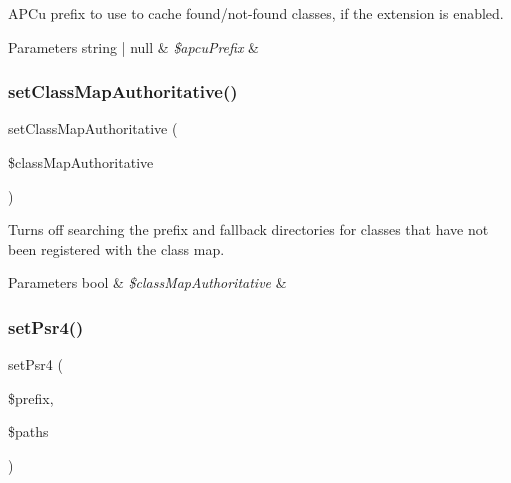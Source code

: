 A\+P\+Cu prefix to use to cache found/not-\/found classes, if the extension is enabled.


\begin{DoxyParams}[1]{Parameters}
string | null & {\em \$apcu\+Prefix} & \\
\hline
\end{DoxyParams}
\mbox{\label{class_composer_1_1_autoload_1_1_class_loader_aa3d6610396da6f5bef836d4fc5547816}} 
\subsubsection{\texorpdfstring{set\+Class\+Map\+Authoritative()}{setClassMapAuthoritative()}}
{\footnotesize\ttfamily set\+Class\+Map\+Authoritative (\begin{DoxyParamCaption}\item[{}]{\$class\+Map\+Authoritative }\end{DoxyParamCaption})}

Turns off searching the prefix and fallback directories for classes that have not been registered with the class map.


\begin{DoxyParams}[1]{Parameters}
bool & {\em \$class\+Map\+Authoritative} & \\
\hline
\end{DoxyParams}
\mbox{\label{class_composer_1_1_autoload_1_1_class_loader_a7f92172519c08357430e7da877a88995}} 
\subsubsection{\texorpdfstring{set\+Psr4()}{setPsr4()}}
{\footnotesize\ttfamily set\+Psr4 (\begin{DoxyParamCaption}\item[{}]{\$prefix,  }\item[{}]{\$paths }\end{DoxyParamCaption})}

